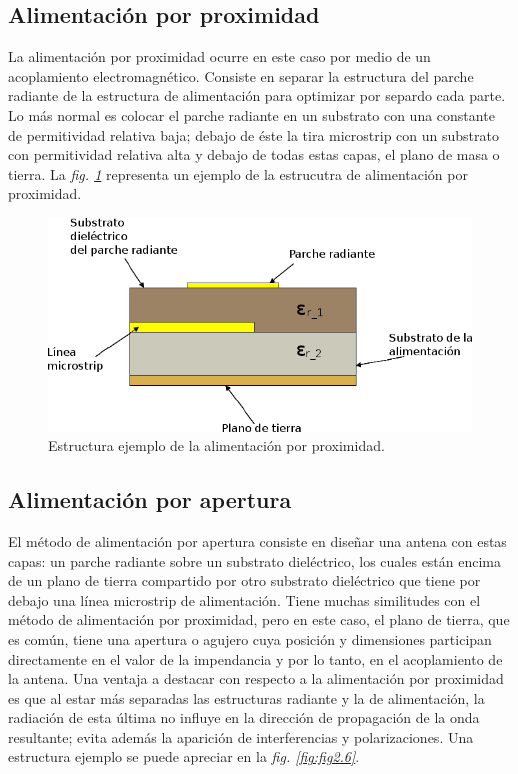 \subsection{Alimentación por proximidad}\label{subsec:alimentacion-por-proximidad}

La alimentación por proximidad ocurre en este caso por medio de un acoplamiento electromagnético. Consiste en separar la estructura del parche radiante de la estructura de alimentación para optimizar por separdo cada parte. Lo más normal es colocar el parche radiante en un substrato con una constante de permitividad relativa baja; debajo de éste la tira microstrip con un substrato con permitividad relativa alta y debajo de todas estas capas, el plano de masa o tierra. La \textit{fig. \ref{fig:fig2.5}} representa un ejemplo de la estrucutra de alimentación por proximidad.

\begin{figure}[!htb]
    \centering
    \includegraphics[scale=0.45]{./ContextoTecnologico/proximidad_2}
    \caption{Estructura ejemplo de la alimentación por proximidad.}
    \label{fig:fig2.5}
\end{figure}

\subsection{Alimentación por apertura}\label{subsec:alimentacion-por-apertura}

El método de alimentación por apertura consiste en diseñar una antena con estas capas: un parche radiante sobre un substrato dieléctrico, los cuales están encima de un plano de tierra compartido por otro substrato dieléctrico que tiene por debajo una línea microstrip de alimentación. Tiene muchas similitudes con el método de alimentación por proximidad, pero en este caso, el plano de tierra, que es común, tiene una apertura o agujero cuya posición y dimensiones participan directamente en el valor de la impendancia y por lo tanto, en el acoplamiento de la antena. Una ventaja a destacar con respecto a la alimentación por proximidad es que al estar más separadas las estructuras radiante y la de alimentación, la radiación de esta última no influye en la dirección de propagación de la onda resultante; evita además la aparición de interferencias y polarizaciones. Una estructura ejemplo se puede apreciar en la \textit{fig. \ref{fig:fig2.6}}.

